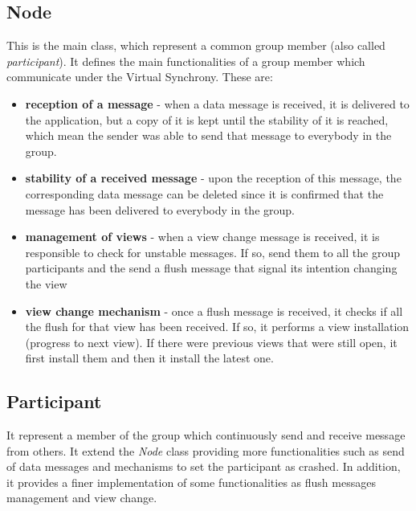 \documentclass[11pt]{article}
\begin{document}
	\subsection{Node}
	This is the main class, which represent a common group member (also called \textit{participant}). It defines the main functionalities of a group member which communicate under the Virtual Synchrony. These are:
	\begin{itemize}
		\item \textbf{reception of a message} - when a data message is received, it is delivered to the application, but a copy of it is kept until the stability of it is reached, which mean the sender was able to send that message to everybody in the group.
		\item \textbf{stability of a received message} - upon the reception of this message, the corresponding data message can be deleted since it is confirmed that the message has been delivered to everybody in the group.
		\item \textbf{management of views} - when a view change message is received, it is responsible to check for unstable messages. If so, send them to all the group participants and the send a flush message that signal its intention changing the view
		\item \textbf{view change mechanism} - once a flush message is received, it checks if all the flush for that view has been received. If so, it performs a view installation (progress to next view). If there were previous views that were still open, it first install them and then it install the latest one.
	\end{itemize}
	
	\subsection{Participant}
	It represent a member of the group which continuously send and receive message from others. It extend the \textit{Node} class providing more functionalities such as send of data messages and mechanisms to set the participant as crashed. In addition, it provides a finer implementation of some functionalities as flush messages management and view change.
	
\end{document}
